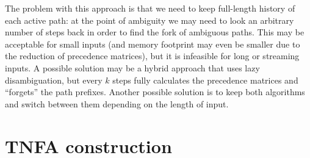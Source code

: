 \documentclass[AMA,STIX1COL]{WileyNJD-v2}
\begin{document}
The problem with this approach is that we need to keep full-length history of each active path:
at the point of ambiguity we may need to look an arbitrary number of steps back
in order to find the fork of ambiguous paths.
%
This may be acceptable for small inputs (and memory footprint may even be smaller due to the reduction of precedence matrices),
but it is infeasible for long or streaming inputs.
%
A possible solution may be a hybrid approach that uses lazy disambiguation,
but every $k$ steps fully calculates the precedence matrices and ``forgets'' the path prefixes.
Another possible solution is to keep both algorithms and switch between them depending on the length of input.


\section{TNFA construction}\label{section_tnfa}
\end{document}
